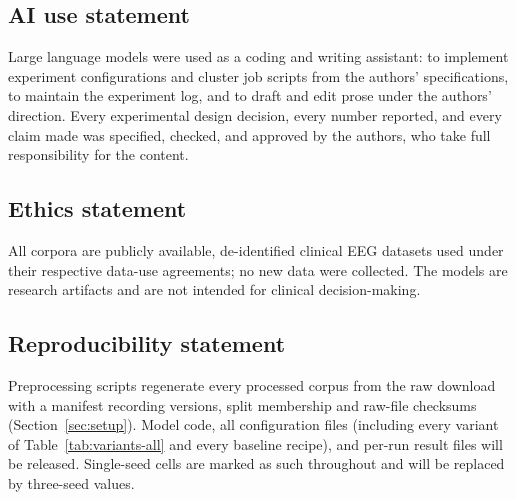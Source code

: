 
\subsection*{AI use statement}
Large language models were used as a coding and writing assistant: to
implement experiment configurations and cluster job scripts from the
authors' specifications, to maintain the experiment log, and to draft and
edit prose under the authors' direction. Every experimental design
decision, every number reported, and every claim made was specified,
checked, and approved by the authors, who take full responsibility for
the content.

\subsection*{Ethics statement}
All corpora are publicly available, de-identified clinical EEG datasets
used under their respective data-use agreements; no new data were
collected. The models are research artifacts and are not intended for
clinical decision-making.

\subsection*{Reproducibility statement}
Preprocessing scripts regenerate every processed corpus from the raw
download with a manifest recording versions, split membership and raw-file
checksums (Section~\ref{sec:setup}). Model code, all configuration files
(including every variant of Table~\ref{tab:variants-all} and every
baseline recipe), and per-run result files will be released. Single-seed
cells are marked as such throughout and will be replaced by three-seed
values.
